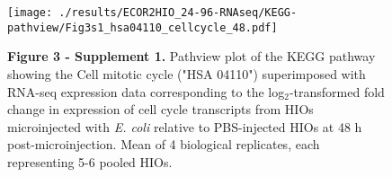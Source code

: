 \documentclass[9pt,lineo]{elife}
\date{\today}
\title{}
\begin{document}
\begin{figure}
\begin{fullwidth}
 \centering\texttt{[image: ./results/ECOR2HIO\_24-96-RNAseq/KEGG-pathview/Fig3s1\_hsa04110\_cellcycle\_48.pdf]}
 \caption*{\textbf{Figure 3 - Supplement 1. } Pathview \citep{pathview:2013} plot of the KEGG \citep{Kanehisa:2000} pathway showing the Cell mitotic cycle ("HSA 04110") superimposed with RNA-seq expression data corresponding to the log$_{2}$-transformed fold change in expression of cell cycle transcripts from HIOs microinjected with \textit{E. coli} relative to PBS-injected HIOs at 48 h post-microinjection. Mean of 4 biological replicates, each representing 5-6 pooled HIOs.}
\label{fig:fullwidth}
\end{fullwidth}
\end{figure}
\end{document}
